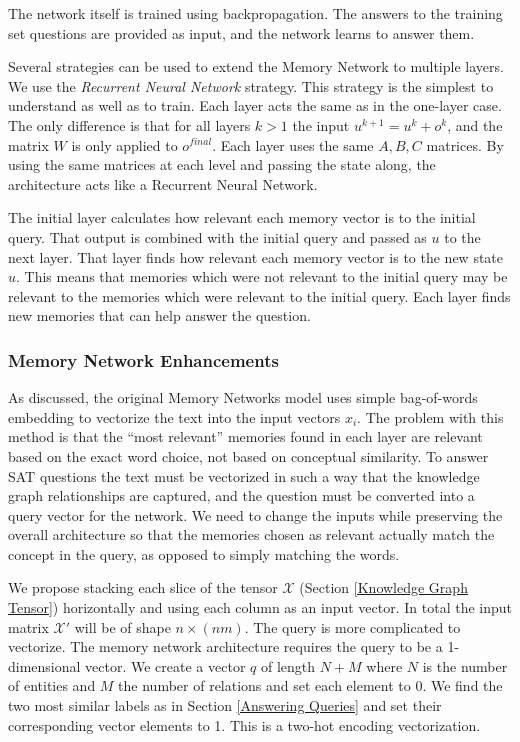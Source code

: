 \documentclass[pageno]{final_paper}
\begin{document}
The network itself is trained using backpropagation. The answers to the training
set questions are provided as input, and the network learns to answer them.

Several strategies can be used to extend the Memory Network to multiple layers.
We use the \textit{Recurrent Neural Network} strategy. This strategy is the
simplest to understand as well as to train. Each layer acts the same as in the
one-layer case. The only difference is that for all layers $k > 1$ the input
$u^{k+1} = u^k + o^k$, and the matrix $W$ is only applied to $o^{final}$. Each
layer uses the same $A,B,C$ matrices. By using the same matrices at each level
and passing the state along, the architecture acts like a Recurrent Neural
Network.

The initial layer calculates how relevant each memory vector is to the initial
query. That output is combined with the initial query and passed as $u$ to the
next layer. That layer finds how relevant each memory vector is to the new state
$u$. This means that memories which were not relevant to the initial query may
be relevant to the memories which were relevant to the initial query. Each layer
finds new memories that can help answer the question.

\subsubsection{Memory Network Enhancements}
\label{Memory Network Enhancements}

As discussed, the original Memory Networks model uses simple bag-of-words
embedding to vectorize the text into the input vectors ${x_i}$. The problem with
this method is that the ``most relevant'' memories found in each layer are
relevant based on the exact word choice, not based on conceptual similarity. To
answer SAT questions the text must be vectorized in such a way that the
knowledge graph relationships are captured, and the question must be converted
into a query vector for the network. We need to change the inputs while
preserving the overall architecture so that the memories chosen as relevant
actually match the concept in the query, as opposed to simply matching the
words.

We propose stacking each slice of the tensor $\mathcal{X}$ (Section
\ref{Knowledge Graph Tensor}) horizontally and using each column as an input
vector. In total the input matrix $\mathcal{X}'$ will be of shape $n\times
(nm)$. The query is more complicated to vectorize. The memory network
architecture requires the query to be a 1-dimensional vector. We create a vector
$q$ of length $N+M$ where $N$ is the number of entities and $M$ the number of
relations and set each element to 0. We find the two most similar labels as in
Section \ref{Answering Queries} and set their corresponding vector elements to
1. This is a two-hot encoding vectorization.
\end{document}
